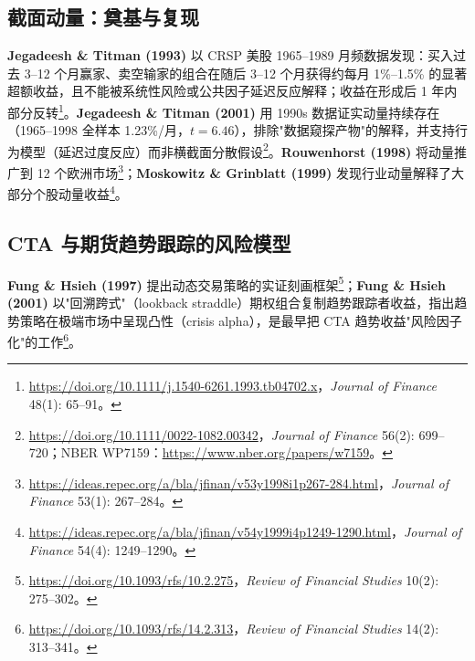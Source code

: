 \documentclass[11pt,a4paper]{article}
\begin{document}
\subsection{截面动量：奠基与复现}
\textbf{Jegadeesh \& Titman (1993)} 以 CRSP 美股 1965--1989 月频数据发现：买入过去 3--12 个月赢家、卖空输家的组合在随后 3--12 个月获得约每月 1\%--1.5\% 的显著超额收益，且不能被系统性风险或公共因子延迟反应解释；收益在形成后 1 年内部分反转\footnote{\url{https://doi.org/10.1111/j.1540-6261.1993.tb04702.x}，\emph{Journal of Finance} 48(1): 65--91。}。\textbf{Jegadeesh \& Titman (2001)} 用 1990s 数据证实动量持续存在（1965--1998 全样本 1.23\%/月，$t=6.46$），排除"数据窥探产物"的解释，并支持行为模型（延迟过度反应）而非横截面分散假设\footnote{\url{https://doi.org/10.1111/0022-1082.00342}，\emph{Journal of Finance} 56(2): 699--720；NBER WP7159：\url{https://www.nber.org/papers/w7159}。}。\textbf{Rouwenhorst (1998)} 将动量推广到 12 个欧洲市场\footnote{\url{https://ideas.repec.org/a/bla/jfinan/v53y1998i1p267-284.html}，\emph{Journal of Finance} 53(1): 267--284。}；\textbf{Moskowitz \& Grinblatt (1999)} 发现行业动量解释了大部分个股动量收益\footnote{\url{https://ideas.repec.org/a/bla/jfinan/v54y1999i4p1249-1290.html}，\emph{Journal of Finance} 54(4): 1249--1290。}。

\subsection{CTA 与期货趋势跟踪的风险模型}
\textbf{Fung \& Hsieh (1997)} 提出动态交易策略的实证刻画框架\footnote{\url{https://doi.org/10.1093/rfs/10.2.275}，\emph{Review of Financial Studies} 10(2): 275--302。}；\textbf{Fung \& Hsieh (2001)} 以"回溯跨式"（lookback straddle）期权组合复制趋势跟踪者收益，指出趋势策略在极端市场中呈现凸性（crisis alpha），是最早把 CTA 趋势收益"风险因子化"的工作\footnote{\url{https://doi.org/10.1093/rfs/14.2.313}，\emph{Review of Financial Studies} 14(2): 313--341。}。
\end{document}
